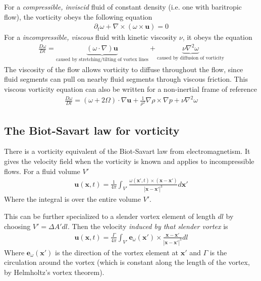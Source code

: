 \documentclass[a4paper, 12pt]{article}
\numberwithin{equation}{subsubsection}
\begin{document}
For a \textit{compressible, inviscid} fluid of constant density (i.e. one with baritropic flow), the vorticity obeys the following equation
\begin{align}
	\partial_t \omega + \nabla \times (\omega \times \mathbf{u}) = 0
\end{align}
For a \textit{incompressible, viscous} fluid with kinetic viscosity $\nu$, it obeys the equation
\begin{align}
	\frac{D \omega}{D t} = \underbrace{(\omega \cdot \nabla) \mathbf{u}}_\text{caused by stretching/tilting of vortex lines} + \underbrace{\nu\nabla^2 \omega}_\text{caused by diffusion of vorticity}
\end{align}
The viscosity of the flow allows vorticity to diffuse throughout the flow, since fluid segments can pull on nearby fluid segments through viscous friction. This viscous vorticity equation can also be written for a non-inertial frame of reference
\begin{align}
	\frac{D \omega}{D t} = (\omega + 2 \Omega) \cdot \nabla \mathbf{u} + \frac{1}{\rho^2} \nabla \rho \times \nabla p + \nu \nabla^2 \omega
\end{align}


\subsection{The Biot-Savart law for vorticity}
There is a vorticity equivalent of the Biot-Savart law from electromagnetism. It gives the velocity field when the vorticity is known and applies to incompressible flows. For a fluid volume $V'$
\begin{align}
	\mathbf{u}(\mathbf{x}, t) = \frac{1}{4 \pi} \int_{V'} \frac{\omega(\mathbf{x}', t) \times (\mathbf{x} - \mathbf{x}')}{|\mathbf{x} - \mathbf{x}'|^3} d\mathbf{x}'
\end{align}
Where the integral is over the entire volume $V'$.

This can be further specialized to a slender vortex element of length $dl$ by choosing $V' = \Delta A' dl$. Then the velocity \textit{induced by that slender vortex} is
\begin{align}
	\mathbf{u}(\mathbf{x}, t) = \frac{\Gamma}{4 \pi} \int_{V'} \mathbf{e}_\omega(\mathbf{x}') \times \frac{\mathbf{x} - \mathbf{x}'}{|\mathbf{x} - \mathbf{x}'|^3} dl
\end{align}
Where $\mathbf{e}_\omega(\mathbf{x}')$ is the direction of the vortex element at $\mathbf{x}'$ and $\Gamma$ is the circulation around the vortex (which is constant along the length of the vortex, by Helmholtz's vortex theorem).
\end{document}
